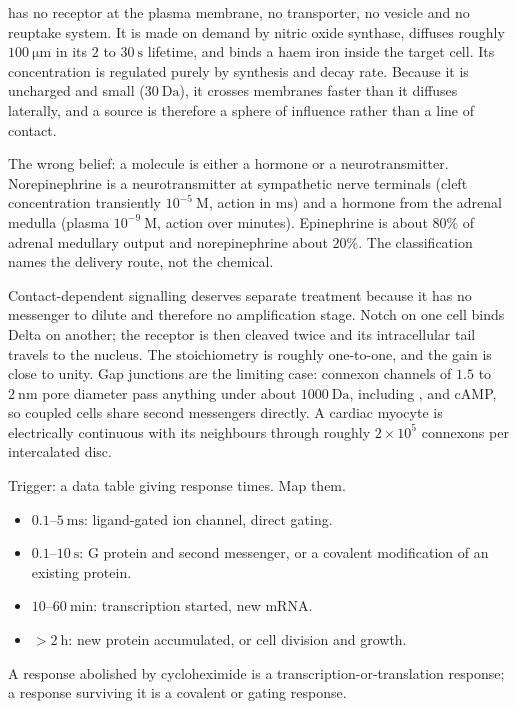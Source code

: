 \begin{obsbox}[title={WORTH NOTICING: gases break every rule}]
 has no receptor at the plasma membrane, no transporter, no vesicle and no
reuptake system. It is made on demand by nitric oxide synthase, diffuses roughly
$100\ \mathrm{\mu m}$ in its $2$ to $30\ \mathrm{s}$ lifetime, and binds a haem iron
inside the target cell. Its concentration is regulated purely by synthesis and decay
rate. Because it is uncharged and small ($30\ \mathrm{Da}$), it crosses membranes
faster than it diffuses laterally, and a source is therefore a sphere of influence
rather than a line of contact.
\end{obsbox}

\begin{warnbox}[title={TRAP: the same molecule is a hormone and a transmitter}]
The wrong belief: a molecule is either a hormone or a neurotransmitter.
Norepinephrine is a neurotransmitter at sympathetic nerve terminals (cleft
concentration transiently $10^{-5}\ \mathrm{M}$, action in $\mathrm{ms}$) and a
hormone from the adrenal medulla (plasma $10^{-9}\ \mathrm{M}$, action over minutes).
Epinephrine is about $80\%$ of adrenal medullary output and norepinephrine about
$20\%$. The classification names the delivery route, not the chemical.
\end{warnbox}

Contact-dependent signalling deserves separate treatment because it has no messenger
to dilute and therefore no amplification stage. Notch on one cell binds Delta on
another; the receptor is then cleaved twice and its intracellular tail travels to the
nucleus. The stoichiometry is roughly one-to-one, and the gain is close to unity. Gap
junctions are the limiting case: connexon channels of $1.5$ to $2\ \mathrm{nm}$ pore
diameter pass anything under about $1000\ \mathrm{Da}$, including ,
 and cAMP, so coupled cells share second messengers directly. A cardiac
myocyte is electrically continuous with its neighbours through roughly
$2\times10^{5}$ connexons per intercalated disc.

\begin{tipbox}[title={TECHNIQUE: latency tells you the mechanism}]
Trigger: a data table giving response times. Map them.
\begin{itemize}
\item $0.1$--$5\ \mathrm{ms}$: ligand-gated ion channel, direct gating.
\item $0.1$--$10\ \mathrm{s}$: G protein and second messenger, or a covalent
modification of an existing protein.
\item $10$--$60\ \mathrm{min}$: transcription started, new mRNA.
\item $>2\ \mathrm{h}$: new protein accumulated, or cell division and growth.
\end{itemize}
A response abolished by cycloheximide is a transcription-or-translation response; a
response surviving it is a covalent or gating response.
\end{tipbox}


